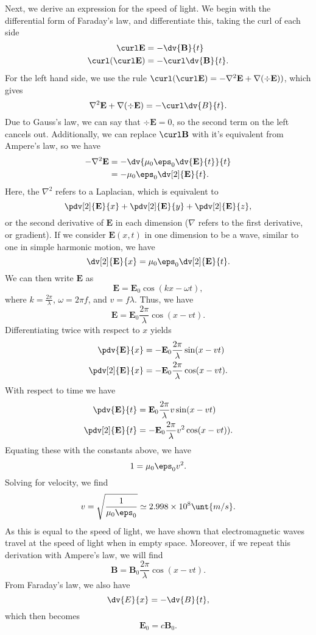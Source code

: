 \documentclass[11pt]{article}
\begin{document}
Next, we derive an expression for the speed of light. We begin with the differential form of Faraday's law, and differentiate this, taking the curl of each side
\begin{align*}
    \curl \mathbf{E} &= -\dv{\mathbf{B}}{t} \\
    \curl (\curl\mathbf{E}) &= -\curl\dv{\mathbf{B}}{t}.
\end{align*}
For the left hand side, we use the rule $\curl(\curl\mathbf{E}) = -\nabla^2\mathbf{E} + \nabla(\div\mathbf{E}))$, which gives
\[\mathbf{\nabla}^2\mathbf{E} + \nabla(\div\mathbf{E}) = -\curl\dv{B}{t}.\]
Due to Gauss's law, we can say that $\div\mathbf{E} = 0$, so the second term on the left cancels out. Additionally, we can replace $\curl\mathbf{B}$ with it's equivalent from Ampere's law, so we have
\begin{align*}
    -\nabla^2\mathbf{E} &= -\dv{\mu_0\eps_0\dv{\mathbf{E}}{t}}{t} \\
    &= -\mu_0\eps_0\dv[2]{\mathbf{E}}{t}.
\end{align*}
Here, the $\nabla^2$ refers to a Laplacian, which is equivalent to
\[\pdv[2]{\mathbf{E}}{x} + \pdv[2]{\mathbf{E}}{y} + \pdv[2]{\mathbf{E}}{z},\]
or the second derivative of $\mathbf{E}$ in each dimension ($\nabla$ refers to the first derivative, or gradient). If we consider $\mathbf{E}(x,t)$ in one dimension to be a wave, similar to one in simple harmonic motion, we have
\[\dv[2]{\mathbf{E}}{x} = \mu_0\eps_0\dv[2]{\mathbf{E}}{t}.\]
We can then write $\mathbf{E}$ as
\[\mathbf{E} = \mathbf{E}_0\cos(kx - \omega t),\]
where $k = \frac{2\pi}{\lambda}$, $\omega = 2\pi f$, and $v = f\lambda$. Thus, we have
\[\mathbf{E} = \mathbf{E}_0 \frac{2\pi}{\lambda}\cos(x-vt).\]
Differentiating twice with respect to $x$ yields
\begin{align*}
    \pdv{\mathbf{E}}{x} &= -\mathbf{E}_0\frac{2\pi}{\lambda} \sin(x-vt) \\
    \pdv[2]{\mathbf{E}}{x} &= -\mathbf{E}_0\frac{2\pi}{\lambda}\cos(x-vt).
\end{align*}
With respect to time we have
\begin{align*}
    \pdv{\mathbf{E}}{t} &= \mathbf{E}_0\frac{2\pi}{\lambda}v\sin(x-vt) \\
    \pdv[2]{\mathbf{E}}{t} &= -\mathbf{E}_0\frac{2\pi}{\lambda}v^2\cos(x-vt)).
\end{align*}
Equating these with the constants above, we have
\[1 = \mu_0\eps_0 v^2.\]
Solving for velocity, we find
\[v = \sqrt{\frac{1}{\mu_0\eps_0}} \simeq 2.998 \times 10^{8} \unt{m/s}.\]
As this is equal to the speed of light, we have shown that electromagnetic waves travel at the speed of light when in empty space. Moreover, if we repeat this derivation with Ampere's law, we will find
\[\mathbf{B} = \mathbf{B}_0 \frac{2\pi}{\lambda} \cos(x-vt).\]
From Faraday's law, we also have
\[\dv{E}{x} = -\dv{B}{t},\]
which then becomes \[\mathbf{E}_0 = c\mathbf{B}_0.\]
\end{document}
